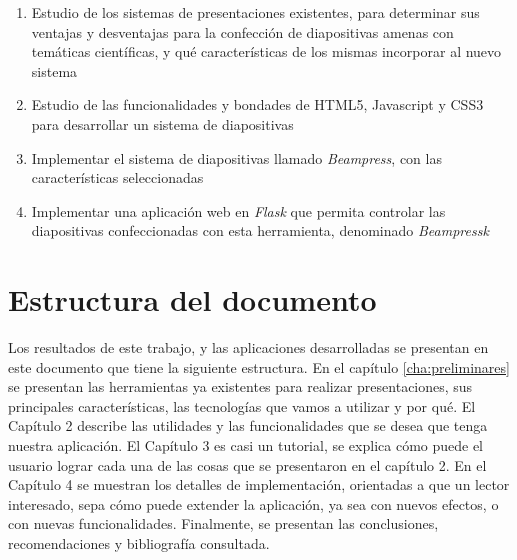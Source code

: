 \begin{introduction}
		\begin{enumerate}
			\item Estudio de los sistemas de presentaciones existentes, para determinar sus ventajas y desventajas para la confección de diapositivas amenas con temáticas científicas, y qué características de los mismas incorporar al nuevo sistema
			\item Estudio de las funcionalidades y bondades de HTML5, Javascript y CSS3 para desarrollar un sistema de diapositivas
			\item Implementar el sistema de diapositivas llamado \textit{Beampress}, con las características seleccionadas
			\item Implementar una aplicación web en \textit{Flask} que permita controlar las diapositivas confeccionadas con esta herramienta, denominado \textit{Beampressk}
		\end{enumerate}

	\section*{Estructura del documento}
	
		Los resultados de este trabajo, y las aplicaciones desarrolladas se presentan en este documento que tiene la siguiente estructura. En el capítulo \ref{cha:preliminares} se presentan las herramientas ya existentes para realizar presentaciones, sus principales características, las tecnologías que vamos a utilizar y por qué. El Capítulo 2 describe las utilidades y las funcionalidades que se desea que tenga nuestra aplicación. El Capítulo 3 es casi un tutorial, se explica cómo puede el usuario lograr cada una de las cosas que se presentaron en el capítulo 2. En el Capítulo 4 se muestran los detalles de implementación, orientadas a que un lector interesado, sepa cómo puede extender la aplicación, ya sea con nuevos efectos, o con nuevas funcionalidades. Finalmente, se presentan las conclusiones, recomendaciones y bibliografía consultada.






\end{introduction}




